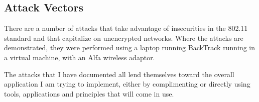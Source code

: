 \clearpage
\subsection{Attack Vectors}
\label{sec:attacks}
There are a number of attacks that take advantage of insecurities in the 802.11 standard and that capitalize on unencrypted networks.  Where the attacks are demonstrated, they were performed using a laptop running BackTrack running in a virtual machine, with an Alfa wireless adaptor.

The attacks that I have documented all lend themselves toward the overall application I am trying to implement, either by complimenting or directly using tools, applications and principles that will come in use.




